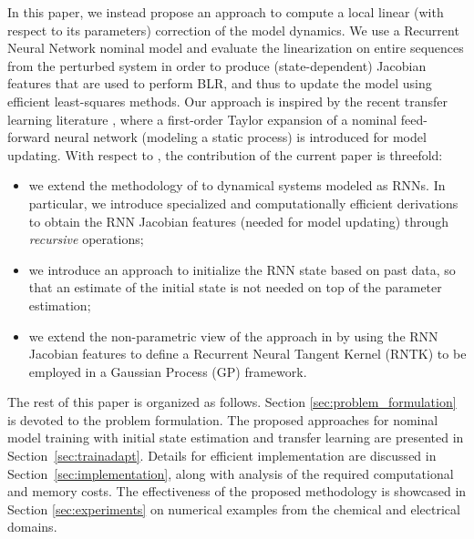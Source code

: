 \documentclass{article}
\begin{document}
In this paper, we instead propose an approach to compute a local linear (with respect to its parameters) correction of the model dynamics. We use a Recurrent Neural Network nominal model and evaluate the linearization on entire sequences from the perturbed system in order to produce (state-dependent) Jacobian features that are used to perform BLR, and thus to update the model  using efficient least-squares methods. 
Our approach is inspired by the recent transfer learning literature  \cite{maddox2021fast}, where a first-order Taylor expansion of a nominal feed-forward neural network (modeling a static process) is introduced for model updating. With respect to \cite{maddox2021fast}, the contribution of the current paper is threefold:
\begin{itemize}
    \item we extend the methodology of \cite{maddox2021fast} to dynamical systems modeled as RNNs. In particular, we introduce {specialized} and computationally efficient derivations to obtain the RNN Jacobian features (needed for model updating) through \emph{recursive}  operations;  
    \item we introduce an approach to initialize the RNN state based on past data, so that an estimate of the initial state is not needed on top of the parameter estimation;  
    \item we extend the non-parametric view of the approach in \cite{maddox2021fast} by using the RNN Jacobian features to define a Recurrent Neural Tangent Kernel (RNTK) to be employed in a Gaussian Process (GP) framework. 
    \end{itemize}    
    

The rest of this paper is organized as follows. Section \ref{sec:problem_formulation} is devoted to the problem formulation. The proposed approaches for nominal model training with initial state estimation  and 
transfer learning  are presented in Section~\ref{sec:trainadapt}. Details for efficient implementation are discussed in Section~\ref{sec:implementation}, along with analysis of  the required computational and memory costs. The effectiveness of the proposed methodology is showcased in Section \ref{sec:experiments} on numerical examples from the chemical and electrical domains.
\end{document}
